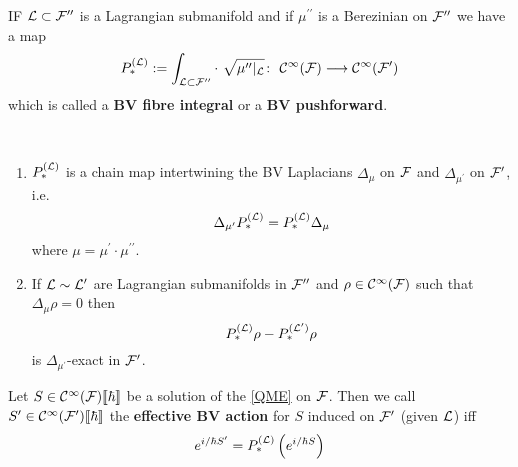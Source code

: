 \begin{definition}
  IF $\mathcal{L} \subset {\mathcal{F}}^{\prime\prime}$ is a Lagrangian submanifold and if $\mu^{\prime\prime}$ is a Berezinian on ${\mathcal{F}}^{\prime\prime}$ we have a map
  \begin{equation}
    P_*^{(\mathcal{L})} := \int_{\mathcal{L} \subset {\mathcal{F}}^{\prime\prime}} \cdot \ \sqrt{\mu^{\prime\prime}|_{\mathcal{L}}} \colon \ \mathcal{C}^{\infty}({\mathcal{F}}) \longrightarrow \mathcal{C}^{\infty}({\mathcal{F}}^\prime)
  \end{equation}
  which is called a \textbf{BV fibre integral} or a \textbf{BV pushforward}.
\end{definition}

\begin{theo}~
  \begin{enumerate}
    \item $P_*^{(\mathcal{L})}$ is a chain map intertwining the BV Laplacians $\Delta_\mu$ on ${\mathcal{F}}$ and $\Delta_{\mu^\prime}$ on ${\mathcal{F}}^\prime$, i.e.
    \begin{equation}
      \Delta_{\mu^\prime} P_*^{(\mathcal{L})} = P_*^{(\mathcal{L})} \Delta_\mu
    \end{equation}
    where $\mu = \mu^\prime \cdot \mu^{\prime\prime}$.

    \item If $\mathcal{L} \sim \mathcal{L}^\prime$ are Lagrangian submanifolds in ${\mathcal{F}}^{\prime\prime}$ and $\rho \in \mathcal{C}^{\infty}({\mathcal{F}})$ such that $\Delta_\mu \rho = 0$ then
    \begin{equation}
      P_*^{(\LL)} \rho - P_*^{(\LL^\prime)} \rho%
    \end{equation}
    is $\Delta_{\mu^\prime}$-exact in ${\mathcal{F}}'$.
  \end{enumerate}
\end{theo}


\begin{definition}
  Let $S \in \mathcal{C}^{\infty}({\mathcal{F}})\llbracket\hbar\rrbracket$ be a solution of the \eqref{QME} on ${\mathcal{F}}$. Then we call $S^\prime \in \mathcal{C}^{\infty}({\mathcal{F}}^\prime)\llbracket\hbar\rrbracket$ the \textbf{effective BV action} for $S$ induced on ${\mathcal{F}}^\prime$ (given $\mathcal{L}$) iff
  \begin{equation}
    e^{i/\hbar S^\prime} = P_*^{(\mathcal{L})} \left( e^{i/\hbar S} \right)
  \end{equation}
\end{definition}

